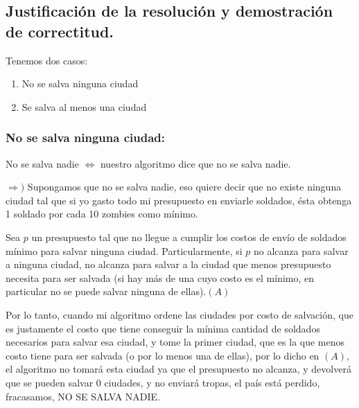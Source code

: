 
\vspace*{0.6cm}

\subsection{Justificación de la resolución y demostración de correctitud.}

\vspace*{0.3cm}

Tenemos dos casos:
\begin{enumerate}
	\item No se salva ninguna ciudad
	\item Se salva al menos una ciudad
\end{enumerate}

\subsubsection{No se salva ninguna ciudad:}

No se salva nadie $\Longleftrightarrow$ nuestro algoritmo dice que no se salva nadie.

$\Longrightarrow )$ Supongamos que no se salva nadie, eso quiere decir que no existe ninguna ciudad tal que si yo gasto todo mi presupuesto en enviarle soldados, ésta obtenga 1 soldado por cada 10 zombies como mínimo.

Sea $p$ un presupuesto tal que no llegue a cumplir los costos de envío de soldados mínimo para salvar ninguna ciudad.
Particularmente, si $p$ no alcanza para salvar a ninguna ciudad, no alcanza para salvar a la ciudad que menos presupuesto necesita para ser salvada (si hay más de una cuyo costo es el mínimo, en particular no se puede salvar ninguna de ellas).$(A)$

Por lo tanto, cuando mi algoritmo ordene las ciudades por costo de salvación, que es justamente el costo que tiene conseguir la mínima cantidad de soldados necesarios para salvar esa ciudad, y tome la primer ciudad, que es la que menos costo tiene para ser salvada (o por lo menos una de ellas), por lo dicho en $(A)$, el algoritmo no tomará esta ciudad ya que el presupuesto no alcanza, y devolverá que se pueden salvar 0 ciudades, y no enviará tropas, el país está perdido, fracasamos, NO SE SALVA NADIE.

